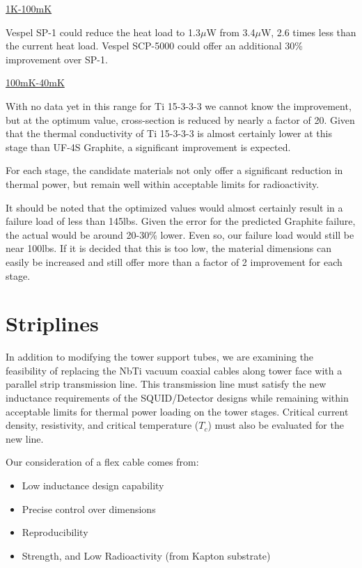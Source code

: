 \documentclass{report}
\begin{document}
\smallskip

\underline{{\large 1K-100mK}}

Vespel SP-1 could reduce the heat load to 1.3$\mu$W from 3.4$\mu$W, 2.6 times less than the current heat load. Vespel SCP-5000 could offer an additional 30\% improvement over SP-1.

\smallskip

\underline{{\large 100mK-40mK}}

With no data yet in this range for Ti 15-3-3-3 we cannot know the improvement, but at the optimum value, cross-section is reduced by nearly a factor of 20. Given that the thermal
conductivity of Ti 15-3-3-3 is almost certainly lower at this stage than UF-4S Graphite, a significant improvement is expected.

\bigskip

For each stage, the candidate materials not only offer a significant reduction in thermal power, but remain well within acceptable limits for radioactivity.

It should be noted that the optimized values would almost certainly result in a failure load of less than 145lbs. Given the error for the predicted Graphite failure, the actual
would be around 20-30\% lower. Even so, our failure load would still be near 100lbs. If it is decided that this is too low, the material dimensions can easily be increased and
still offer more than a factor of 2 improvement for each stage.

\section{Striplines}
In addition to modifying the tower support tubes, we are examining the feasibility of replacing the NbTi vacuum coaxial cables along tower face with a parallel strip transmission
line. This transmission line must satisfy the new inductance requirements of the SQUID/Detector designs while remaining within acceptable limits for thermal power loading on the
tower stages. Critical current density, resistivity, and critical temperature ($T_{c}$) must also be evaluated for the new line.

Our consideration of a flex cable comes from:
\begin{itemize}
\item Low inductance design capability
\item Precise control over dimensions
\item Reproducibility
\item Strength, and Low Radioactivity (from Kapton substrate)
\end{itemize}
\end{document}
